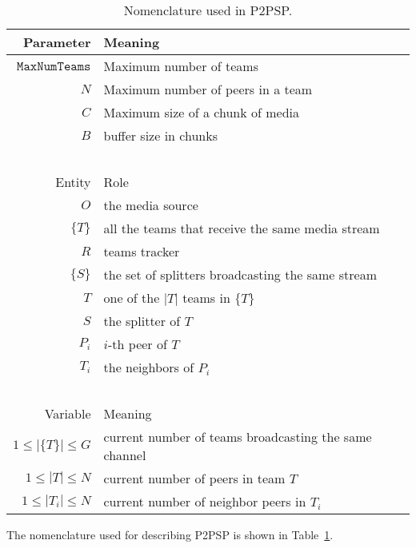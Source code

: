 \begin{table}
  \begin{tabular}{rl}
    Parameter & Meaning \\
    \hline
    $\mathtt{MaxNumTeams}$ & Maximum number of teams \\
    $N$       & Maximum number of peers in a team \\
    $C$       & Maximum size of a chunk of media \\
    $B$       & buffer size in chunks \\
    ~\\
    Entity  & Role \\
    \hline
    $O$     & the media source \\
    $\{T\}$ & all the teams that receive the same media stream \\
    $R$     & teams tracker \\
    $\{S\}$ & the set of splitters broadcasting the same stream \\
    $T$     & one of the $|T|$ teams in $\{T\}$ \\
    $S$     & the splitter of $T$ \\
    $P_i$   & $i$-th peer of $T$ \\
    $T_i$   & the neighbors of $P_i$ \\
    ~\\
    Variable            & Meaning \\
    \hline
    $1\leq |\{T\}|\leq G$ & current number of teams broadcasting the same channel \\
    $1\leq |T|\leq N$     & current number of peers in team $T$ \\
    $1\leq |T_i|\leq N$   & current number of neighbor peers in $T_i$ \\
  \end{tabular}
  \caption{Nomenclature used in P2PSP.\label{tab:P2PSP_nomenclature}}
\end{table}

The nomenclature used for describing P2PSP is shown in
Table~\ref{tab:P2PSP_nomenclature}.
